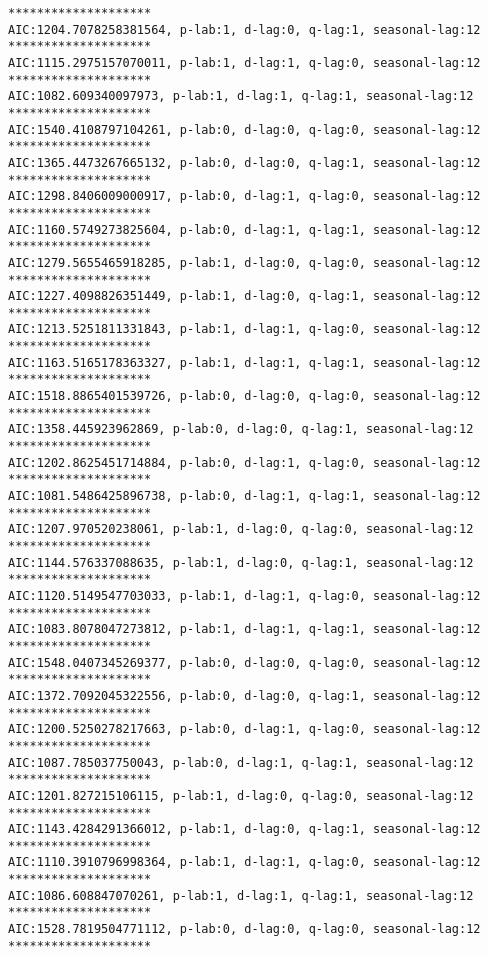 \documentclass[11pt]{article}
\begin{document}
    \begin{Verbatim}[commandchars=\\\{\}]
********************
AIC:1204.7078258381564, p-lab:1, d-lag:0, q-lag:1, seasonal-lag:12
********************
AIC:1115.2975157070011, p-lab:1, d-lag:1, q-lag:0, seasonal-lag:12
********************
AIC:1082.609340097973, p-lab:1, d-lag:1, q-lag:1, seasonal-lag:12
********************
AIC:1540.4108797104261, p-lab:0, d-lag:0, q-lag:0, seasonal-lag:12
********************
AIC:1365.4473267665132, p-lab:0, d-lag:0, q-lag:1, seasonal-lag:12
********************
AIC:1298.8406009000917, p-lab:0, d-lag:1, q-lag:0, seasonal-lag:12
********************
AIC:1160.5749273825604, p-lab:0, d-lag:1, q-lag:1, seasonal-lag:12
********************
AIC:1279.5655465918285, p-lab:1, d-lag:0, q-lag:0, seasonal-lag:12
********************
AIC:1227.4098826351449, p-lab:1, d-lag:0, q-lag:1, seasonal-lag:12
********************
AIC:1213.5251811331843, p-lab:1, d-lag:1, q-lag:0, seasonal-lag:12
********************
AIC:1163.5165178363327, p-lab:1, d-lag:1, q-lag:1, seasonal-lag:12
********************
AIC:1518.8865401539726, p-lab:0, d-lag:0, q-lag:0, seasonal-lag:12
********************
AIC:1358.445923962869, p-lab:0, d-lag:0, q-lag:1, seasonal-lag:12
********************
AIC:1202.8625451714884, p-lab:0, d-lag:1, q-lag:0, seasonal-lag:12
********************
AIC:1081.5486425896738, p-lab:0, d-lag:1, q-lag:1, seasonal-lag:12
********************
AIC:1207.970520238061, p-lab:1, d-lag:0, q-lag:0, seasonal-lag:12
********************
AIC:1144.576337088635, p-lab:1, d-lag:0, q-lag:1, seasonal-lag:12
********************
AIC:1120.5149547703033, p-lab:1, d-lag:1, q-lag:0, seasonal-lag:12
********************
AIC:1083.8078047273812, p-lab:1, d-lag:1, q-lag:1, seasonal-lag:12
********************
AIC:1548.0407345269377, p-lab:0, d-lag:0, q-lag:0, seasonal-lag:12
********************
AIC:1372.7092045322556, p-lab:0, d-lag:0, q-lag:1, seasonal-lag:12
********************
AIC:1200.5250278217663, p-lab:0, d-lag:1, q-lag:0, seasonal-lag:12
********************
AIC:1087.785037750043, p-lab:0, d-lag:1, q-lag:1, seasonal-lag:12
********************
AIC:1201.827215106115, p-lab:1, d-lag:0, q-lag:0, seasonal-lag:12
********************
AIC:1143.4284291366012, p-lab:1, d-lag:0, q-lag:1, seasonal-lag:12
********************
AIC:1110.3910796998364, p-lab:1, d-lag:1, q-lag:0, seasonal-lag:12
********************
AIC:1086.608847070261, p-lab:1, d-lag:1, q-lag:1, seasonal-lag:12
********************
AIC:1528.7819504771112, p-lab:0, d-lag:0, q-lag:0, seasonal-lag:12
********************

\end{Verbatim}
\end{document}
